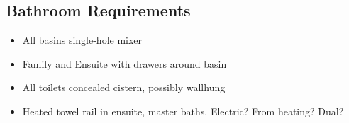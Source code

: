 \subsection{Bathroom Requirements}
\begin{itemize}
\item All basins single-hole mixer
\item Family and Ensuite with drawers around basin
\item All toilets concealed cistern, possibly wallhung
\item Heated towel rail in ensuite, master baths. Electric? From heating? Dual?    
\end{itemize}
